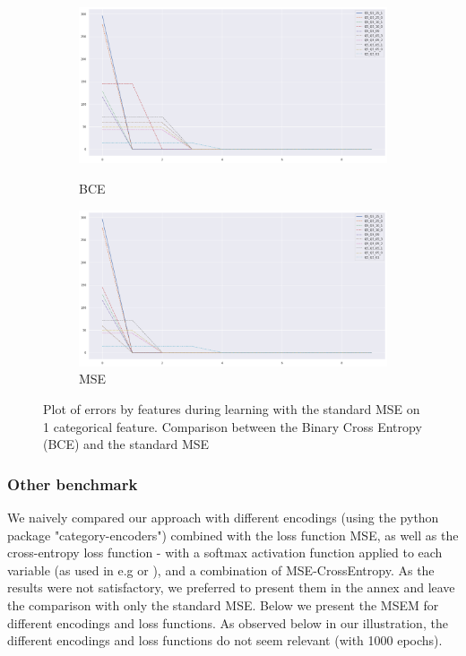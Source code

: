 \documentclass{article}
\theoremstyle{definition}
\begin{document}
\begin{figure}[H]
     \centering
     \begin{subfigure}[b]{0.49\textwidth}
         \centering
         \includegraphics[width=\textwidth]{imgs/Illu/1000Epochs/Learning_curve_BCELoss_1var.png}
         \caption{BCE}
         \quad
         \includegraphics[width=\textwidth]{imgs/Illu/1000Epochs/Learning_curve_MSELoss_1var.png}
         \caption{MSE}
     \end{subfigure}
     \caption{Plot of errors by features during learning with the standard MSE on 1 categorical feature. Comparison between the Binary Cross Entropy (BCE) and the standard MSE}
     \label{learningGraph1var}
\end{figure}






\subsubsection{Other benchmark}
\label{other_BK}

We naively compared our approach with different encodings (using the python package "category-encoders") combined with the loss function MSE, as well as the cross-entropy loss function - with a softmax activation function applied to each variable (as used in e.g \citep{xu2019modeling} or \citep{delong2023use}), and a combination of MSE-CrossEntropy. As the results were not satisfactory, we preferred to present them in the annex and leave the comparison with only the standard MSE. Below we present the MSEM for different encodings and loss functions.
As observed below in our illustration, the different encodings and loss functions do not seem relevant (with 1000 epochs).
\end{document}
